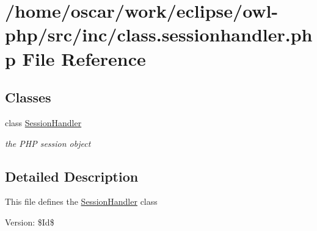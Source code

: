 \hypertarget{class_8sessionhandler_8php}{
\section{/home/oscar/work/eclipse/owl-php/src/inc/class.sessionhandler.php File Reference}
\label{class_8sessionhandler_8php}
}
\subsection*{Classes}
\begin{CompactItemize}
\item 
class \hyperlink{classSessionHandler}{SessionHandler}
\begin{CompactList}\small\item\em the PHP session object \item\end{CompactList}\end{CompactItemize}


\subsection{Detailed Description}
This file defines the \hyperlink{classSessionHandler}{SessionHandler} class \begin{Desc}
\item[Version:]\$Id\$ \end{Desc}
